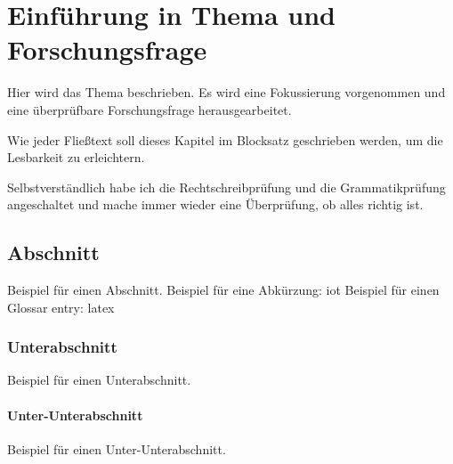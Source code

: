 %

\chapter{Einführung in Thema und Forschungsfrage}


Hier wird das Thema beschrieben. Es wird eine Fokussierung vorgenommen und eine überprüfbare Forschungsfrage herausgearbeitet.

Wie jeder Fließtext soll dieses Kapitel im Blocksatz geschrieben werden, um die Lesbarkeit zu erleichtern.

Selbstverständlich habe ich die Rechtschreibprüfung und die Grammatikprüfung angeschaltet und mache immer wieder eine Überprüfung, ob alles richtig ist.


\section{Abschnitt}

Beispiel für einen Abschnitt. \newline
Beispiel für eine Abkürzung: \gls{iot} \newline
Beispiel für einen Glossar entry: \gls{latex}

\subsection{Unterabschnitt}

Beispiel für einen Unterabschnitt.

\subsubsection{Unter-Unterabschnitt}
Beispiel für einen Unter-Unterabschnitt.